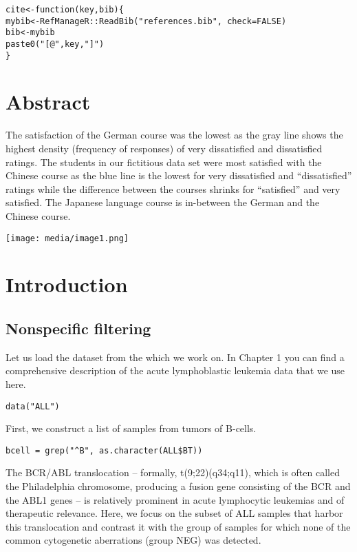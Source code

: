 \begin{verbatim}
cite<-function(key,bib){
mybib<-RefManageR::ReadBib("references.bib", check=FALSE)
bib<-mybib
paste0("[@",key,"]")
}
\end{verbatim}

\hypertarget{abstract}{%
\section{Abstract}\label{abstract}}

The satisfaction of the German course was the lowest as the gray line
shows the highest density (frequency of responses) of very dissatisfied
and dissatisfied ratings. The students in our fictitious data set were
most satisfied with the Chinese course as the blue line is the lowest
for very dissatisfied and ``dissatisfied'' ratings while the difference
between the courses shrinks for ``satisfied'' and very satisfied. The
Japanese language course is in-between the German and the Chinese
course.

\texttt{[image: media/image1.png]}

\hypertarget{introduction}{%
\section{Introduction}\label{introduction}}

\hypertarget{nonspecific-filtering}{%
\subsection{Nonspecific filtering}\label{nonspecific-filtering}}

Let us load the dataset from the which we work on. In Chapter 1 you can
find a comprehensive description of the acute lymphoblastic leukemia
data that we use here.

\begin{verbatim}
data("ALL")
\end{verbatim}

First, we construct a list of samples from tumors of B-cells.

\begin{verbatim}
bcell = grep("^B", as.character(ALL$BT))
\end{verbatim}

The BCR/ABL translocation -- formally, t(9;22)(q34;q11), which is often
called the Philadelphia chromosome, producing a fusion gene consisting
of the BCR and the ABL1 genes -- is relatively prominent in acute
lymphocytic leukemias and of therapeutic relevance. Here, we focus on
the subset of ALL samples that harbor this translocation and contrast it
with the group of samples for which none of the common cytogenetic
aberrations (group NEG) was detected.

